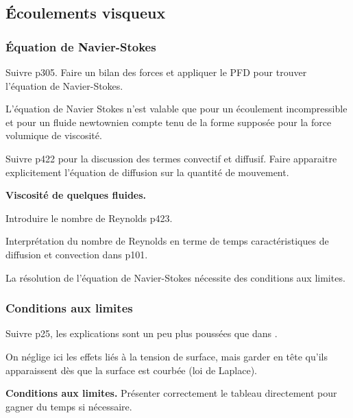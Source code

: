 \subsection{Écoulements visqueux}

\subsubsection{Équation de Navier-Stokes}

Suivre \cite{Sanz2016} p305.
Faire un bilan des forces et appliquer le PFD pour trouver l'équation de Navier-Stokes.
\begin{remarque}
L'équation de Navier Stokes n'est valable que pour un écoulement incompressible et pour un fluide newtownien compte tenu de la forme supposée pour la force volumique de viscosité.
\end{remarque}

Suivre \cite{Olivier2000} p422 pour la discussion des termes convectif et diffusif.
Faire apparaitre explicitement l'équation de diffusion sur la quantité de mouvement.

\begin{slide}
\textbf{Viscosité de quelques fluides.}
\end{slide}

Introduire le nombre de Reynolds \cite{Olivier2000} p423.

\begin{remarque}
Interprétation du nombre de Reynolds en terme de temps caractéristiques de diffusion et convection dans \cite{Guyon2001} p101.
\end{remarque}

\begin{transition}
La résolution de l'équation de Navier-Stokes nécessite des conditions aux limites.
\end{transition}

\subsubsection{Conditions aux limites}

Suivre \cite{Rabaud2019} p25, les explications sont un peu plus poussées que dans \cite{Sanz2016}.
\begin{remarque}
On néglige ici les effets liés à la tension de surface, mais garder en tête qu'ils apparaissent dès que la surface est courbée (loi de Laplace).
\end{remarque}

\begin{slide}
\textbf{Conditions aux limites.}
Présenter correctement le tableau directement pour gagner du temps si nécessaire.
\end{slide}

